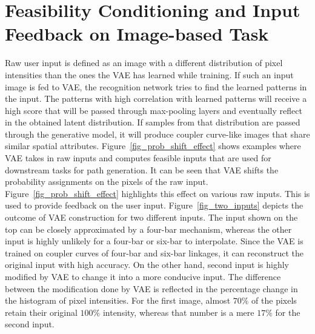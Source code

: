 \section{Feasibility Conditioning and Input Feedback on Image-based Task}\label{sec_task_conditioning_image}
Raw user input is defined as an image with a different distribution of pixel intensities than the ones the VAE has learned while training. 
If such an input image is fed to VAE, the recognition network tries to find the learned patterns in the input. The patterns with high correlation with learned patterns will receive a high score that will be passed through max-pooling layers and eventually reflect in the obtained latent distribution. If samples from that distribution are passed through the generative model, it will produce coupler curve-like images that share similar spatial attributes.
Figure~\ref{fig_prob_shift_effect} shows examples where VAE takes in raw inputs and computes feasible inputs that are used for downstream tasks for path generation. It can be seen that VAE shifts the probability assignments on the pixels of the raw input. Figure~\ref{fig_prob_shift_effect} highlights this effect on various raw inputs. This is used to provide feedback on the user input.    
Figure~\ref{fig_two_inputs} depicts the outcome of VAE construction for two different inputs. The input shown on the top can be closely approximated by a four-bar mechanism, whereas the other input is highly unlikely for a four-bar or six-bar to interpolate. Since the VAE is trained on coupler curves of four-bar and six-bar linkages, it can reconstruct the original input with high accuracy. On the other hand, second input is highly modified by VAE to change it into a more conducive input. The difference between the modification done by VAE is reflected in the percentage change in the histogram of pixel intensities. For the first image, almost $70\%$ of the pixels retain their original $100\%$ intensity, whereas that number is a mere $17\%$ for the second input. 

